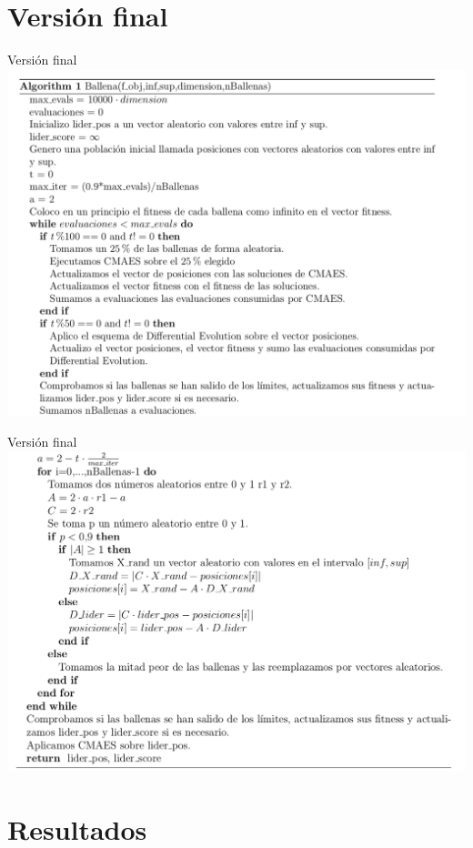 \documentclass[10pt]{beamer}
\begin{document}
\section{Versión final}

	\begin{frame}[fragile]{Versión final}
		\includegraphics[scale=0.25]{./Imagenes/version_final_p1.png}
	\end{frame}

	\begin{frame}[fragile]{Versión final}
		\includegraphics[scale=0.25]{./Imagenes/version_final_p2.png}
	\end{frame}

\section{Resultados}
\end{document}
